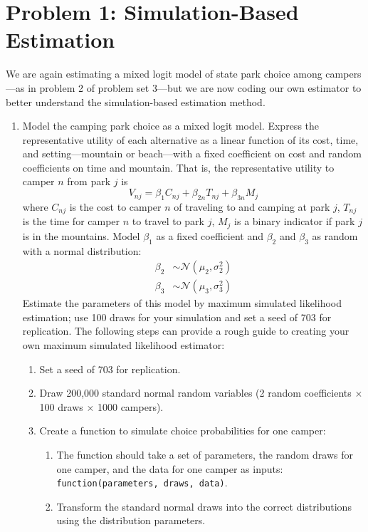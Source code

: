 \documentclass[11pt,letterpaper]{article}\usepackage[]{graphicx}\usepackage[]{color}
\begin{document}
\section*{Problem 1: Simulation-Based Estimation}

We are again estimating a mixed logit model of state park choice among campers---as in problem 2 of problem set 3---but we are now coding our own estimator to better understand the simulation-based estimation method.

\begin{enumerate}[label=\alph*., leftmargin=*]
	\item Model the camping park choice as a mixed logit model. Express the representative utility of each alternative as a linear function of its cost, time, and setting---mountain or beach---with a fixed coefficient on cost and random coefficients on time and mountain. That is, the representative utility to camper $n$ from park $j$ is
	$$V_{nj} = \beta_1 C_{nj} + \beta_{2n} T_{nj} + \beta_{3n} M_j$$
	where $C_{nj}$ is the cost to camper $n$ of traveling to and camping at park $j$, $T_{nj}$ is the time for camper $n$ to travel to park $j$, $M_j$ is a binary indicator if park $j$ is in the mountains. Model $\beta_1$ as a fixed coefficient and $\beta_2$ and $\beta_3$ as random with a normal distribution:
	\begin{align*}
		\beta_2 & \sim \mathcal{N}(\mu_2, \sigma_2^2) \\
		\beta_3 & \sim \mathcal{N}(\mu_3, \sigma_3^2)
	\end{align*}
	Estimate the parameters of this model by maximum simulated likelihood estimation; use 100 draws for your simulation and set a seed of 703 for replication. The following steps can provide a rough guide to creating your own maximum simulated likelihood estimator:
	\begin{enumerate}[label=\Roman*.]
		\item Set a seed of 703 for replication.
		\item Draw 200,000 standard normal random variables (2 random coefficients $\times$ 100 draws $\times$ 1000 campers).
		\item Create a function to simulate choice probabilities for one camper:
		\begin{enumerate}[label=\roman*.]
			\item The function should take a set of parameters, the random draws for one camper, and the data for one camper as inputs: \texttt{function(parameters, draws, data)}.
			\item Transform the standard normal draws into the correct distributions using the distribution parameters.

\end{enumerate}
\end{enumerate}
\end{enumerate}
\end{document}
